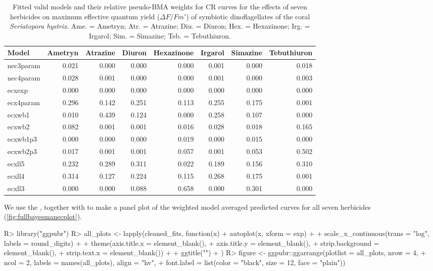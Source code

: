 \documentclass[
  shortnames]{jss}
\begin{document}
\begin{CodeChunk}
\begin{table}

\caption{\label{tab:weightsTab}Fitted valid models and their relative pseudo-BMA weights for CR curves for the effects of seven herbicides on maximum effective quantum yield ($\Delta F / Fm'$) of symbiotic dinoflagellates of the coral \textit{Seriatopora hystrix}. Ame. = Ametryn; Atr. = Atrazine; Diu. = Diuron; Hex. = Hexazinone; Irg. = Irgarol; Sim. = Simazine; Teb. = Tebuthiuron.}
\centering
\begin{tabular}[t]{l|r|r|r|r|r|r|r}
\hline
Model & Ametryn & Atrazine & Diuron & Hexazinone & Irgarol & Simazine & Tebuthiuron\\
\hline
nec3param & 0.021 & 0.000 & 0.000 & 0.000 & 0.001 & 0.000 & 0.018\\
\hline
nec4param & 0.028 & 0.001 & 0.000 & 0.000 & 0.001 & 0.000 & 0.003\\
\hline
ecxexp & 0.000 & 0.000 & 0.000 & 0.000 & 0.000 & 0.000 & 0.000\\
\hline
ecx4param & 0.296 & 0.142 & 0.251 & 0.113 & 0.255 & 0.175 & 0.001\\
\hline
ecxwb1 & 0.010 & 0.439 & 0.124 & 0.000 & 0.258 & 0.107 & 0.000\\
\hline
ecxwb2 & 0.082 & 0.001 & 0.001 & 0.016 & 0.028 & 0.018 & 0.165\\
\hline
ecxwb1p3 & 0.000 & 0.000 & 0.000 & 0.019 & 0.000 & 0.015 & 0.000\\
\hline
ecxwb2p3 & 0.017 & 0.001 & 0.001 & 0.057 & 0.001 & 0.053 & 0.502\\
\hline
ecxll5 & 0.232 & 0.289 & 0.311 & 0.022 & 0.189 & 0.156 & 0.310\\
\hline
ecxll4 & 0.314 & 0.127 & 0.224 & 0.115 & 0.268 & 0.175 & 0.001\\
\hline
ecxll3 & 0.000 & 0.000 & 0.088 & 0.658 & 0.000 & 0.301 & 0.000\\
\hline
\end{tabular}
\end{table}

\end{CodeChunk}

We use the  , together with  \citep{ggpubr} to make a panel plot of the weighted model averaged predicted curves for all seven herbicides (\autoref{fig:fullbayesmanecplot}).

\begin{CodeChunk}
\begin{CodeInput}
R> library("ggpubr")
R> all_plots <- lapply(cleaned_fits, function(x) {
+   autoplot(x, xform = exp) +
+     scale_x_continuous(trans = "log", labels = round_digits) +
+     theme(axis.title.x = element_blank(),
+           axis.title.y = element_blank(),
+           strip.background = element_blank(),
+           strip.text.x = element_blank()) +
+     ggtitle("")
+ })
R> figure <- ggpubr::ggarrange(plotlist = all_plots, nrow = 4,
+   ncol = 2, labels = names(all_plots), align = "hv",
+   font.label = list(color = "black", size = 12, face = "plain"))
\end{CodeInput}
\end{CodeChunk}
\end{document}
